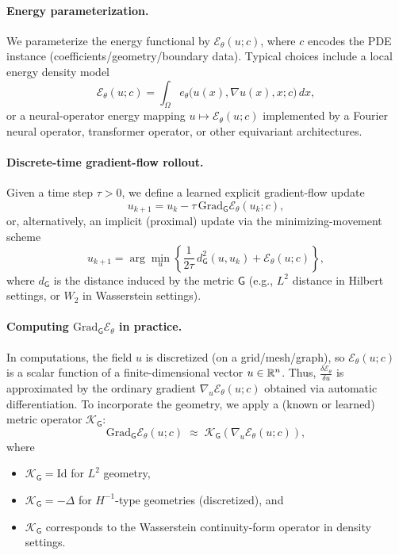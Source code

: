 \documentclass[11pt]{article}
\newcommand{\Grad}{\mathrm{Grad}}
\begin{document}
\paragraph{Energy parameterization.}
We parameterize the energy functional by $\mathcal E_\theta(u;c)$, where $c$ encodes the PDE instance (coefficients/geometry/boundary data).
Typical choices include a local energy density model
\begin{equation}
\label{eq:local-energy}
\mathcal E_\theta(u;c)
=\int_\Omega e_\theta\big(u(x),\nabla u(x),x;c\big)\,dx,
\end{equation}
or a neural-operator energy mapping $u\mapsto \mathcal E_\theta(u;c)$ implemented by a Fourier neural operator, transformer operator, or other equivariant architectures.

\paragraph{Discrete-time gradient-flow rollout.}
Given a time step $\tau>0$, we define a learned explicit gradient-flow update
\begin{equation}
\label{eq:explicit-update}
u_{k+1}
=
u_k
-\tau\,\Grad_{\mathsf G}\mathcal E_\theta(u_k;c),
\end{equation}
or, alternatively, an implicit (proximal) update via the minimizing-movement scheme
\begin{equation}
\label{eq:prox-update}
u_{k+1}
=
\arg\min_{u}\left\{
\frac{1}{2\tau}\,d_{\mathsf G}^2(u,u_k)
+
\mathcal E_\theta(u;c)
\right\},
\end{equation}
where $d_{\mathsf G}$ is the distance induced by the metric $\mathsf G$ (e.g., $L^2$ distance in Hilbert settings, or $W_2$ in Wasserstein settings).

\paragraph{Computing $\Grad_{\mathsf G}\mathcal E_\theta$ in practice.}
In computations, the field $u$ is discretized (on a grid/mesh/graph), so $\mathcal E_\theta(u;c)$ is a scalar function of a finite-dimensional vector $u\in{{\mathbb{R}}}^n$.
Thus, $\frac{\delta \mathcal E_\theta}{\delta u}$ is approximated by the ordinary gradient $\nabla_u \mathcal E_\theta(u;c)$ obtained via automatic differentiation.
To incorporate the geometry, we apply a (known or learned) metric operator $\mathcal K_{\mathsf G}$:
\begin{equation}
\label{eq:metric-operator}
\Grad_{\mathsf G}\mathcal E_\theta(u;c)
\;\approx\;
\mathcal K_{\mathsf G}\!\left(\nabla_u \mathcal E_\theta(u;c)\right),
\end{equation}
where
\begin{itemize}[itemsep=-2pt,topsep=2pt]
    \item $\mathcal K_{\mathsf G}=\mathrm{Id}$ for $L^2$ geometry, \item $\mathcal K_{\mathsf G}=-\Delta$ for $H^{-1}$-type geometries (discretized), and 
    \item $\mathcal K_{\mathsf G}$ corresponds to the Wasserstein continuity-form operator in density settings.
\end{itemize}
\fi
\end{document}
